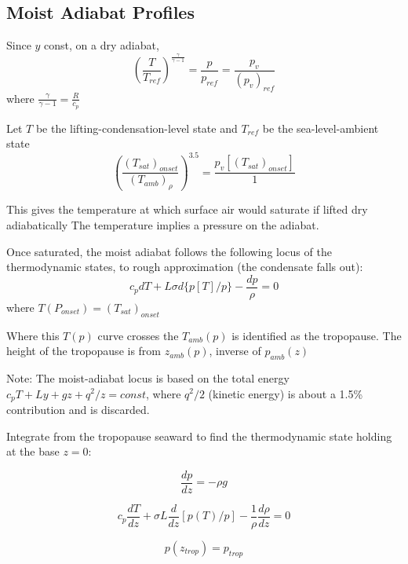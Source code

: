 \documentclass{article}
\begin{document}
\subsection{Moist Adiabat Profiles}

Since $y$ const, on a dry adiabat,   
\begin{equation}
	\left ( \frac{T}{T_{ref}} \right ) ^\frac{\gamma}{\gamma-1} = \frac{p}{p_{ref}} = \frac{p_v}{(p_v)_{ref}}
\end{equation}
where $\frac{\gamma}{\gamma-1} = \frac{R}{c_p}$

Let $T$ be the lifting-condensation-level state and $T_{ref}$ be the sea-level-ambient state
\begin{equation}
	\left ( \frac{ (T_{sat} )_{onset}  }{ (T_{amb})_{\rho} } \right ) ^{3.5} = \frac{ p_v[ (T_{sat})_{onset}]   }{1}
\end{equation}


This gives the temperature at which surface air would saturate if lifted dry adiabatically The temperature implies a pressure on the adiabat.

Once saturated, the moist adiabat follows the following locus of the thermodynamic states, to rough approximation (the condensate falls out):
\begin{equation}
	c_p dT + L \sigma d\{ p[T]/p \} - \frac{dp}{\rho} = 0
\end{equation}
where $T(P_{onset} ) = (T_{sat} )_{onset}$

Where this $T(p)$ curve crosses the $T_{amb}(p)$ is identified as the tropopause. The height of the tropopause is from $z_{amb}(p)$, inverse of $p_{amb}(z)$

Note: The moist-adiabat locus is based on the total energy $c_p T + Ly + gz + q^2/z = const$, where $q^2/2$ (kinetic energy) is about a 1.5\% contribution and is discarded.

Integrate from the tropopause seaward to find the thermodynamic state holding at the base $z=0$:

\begin{equation}
	\frac{dp}{dz} = - \rho g
\end{equation}

\begin{equation}
	c_p \frac{dT}{dz} + \sigma L \frac{d}{dz} [ p(T) / p] - \frac{1}{\rho} \frac{d \rho}{d z} = 0
\end{equation}

\begin{equation}
	p(z_{trop}) = p_{trop} 
\end{equation}
\end{document}
